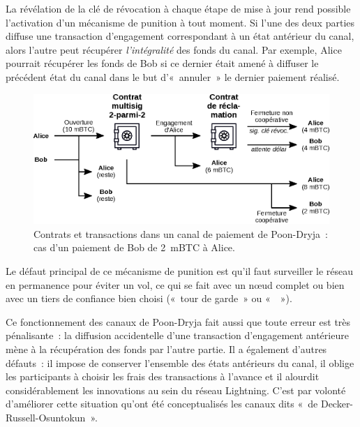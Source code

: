 La révélation de la clé de révocation à chaque étape de mise à jour rend possible l'activation d'un mécanisme de punition à tout moment. Si l'une des deux parties diffuse une transaction d'engagement correspondant à un état antérieur du canal, alors l'autre peut récupérer \emph{l'intégralité} des fonds du canal. Par exemple, Alice pourrait récupérer les fonds de Bob si ce dernier était amené à diffuser le précédent état du canal dans le but d'«~annuler~» le dernier paiement réalisé.

\begin{figure}[ht]
  \centering
  \includegraphics[scale=0.8]{img/lightning-poon-dryja-channel-contracts.eps}
  \caption{Contrats et transactions dans un canal de paiement de Poon-Dryja~: cas d'un paiement de Bob de 2~mBTC à Alice.}
  \label{fig:poon-dryja-contracts}
\end{figure}

Le défaut principal de ce mécanisme de punition est qu'il faut surveiller le réseau en permanence pour éviter un vol, ce qui se fait avec un nœud complet ou bien avec un tiers de confiance bien choisi («~tour de garde~» ou «~~»).

Ce fonctionnement des canaux de Poon-Dryja fait aussi que toute erreur est très pénalisante~: la diffusion accidentelle d'une transaction d'engagement antérieure mène à la récupération des fonds par l'autre partie. Il a également d'autres défauts~: il impose de conserver l'ensemble des états antérieurs du canal, il oblige les participants à choisir les frais des transactions à l'avance et il alourdit considérablement les innovations au sein du réseau Lightning. C'est par volonté d'améliorer cette situation qu'ont été conceptualisés les canaux dits «~de Decker-Russell-Osuntokun~».


